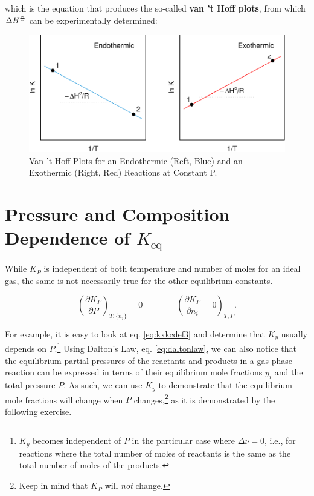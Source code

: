 \documentclass[
]{book}
\theoremstyle{definition}
\theoremstyle{definition}
\theoremstyle{definition}
\theoremstyle{remark}
\begin{document}
which is the equation that produces the so-called \textbf{van 't Hoff plots}, from which \(\Delta H^{-\kern-6pt{\ominus}\kern-6pt-}\) can be experimentally determined:

\begin{figure}

{\centering \includegraphics{pchem1_files/figure-latex/vthoffplt-1} 

}

\caption{Van 't Hoff Plots for an Endothermic (Reft, Blue) and an Exothermic (Right, Red) Reactions at Constant P.}\label{fig:vthoffplt}
\end{figure}

\hypertarget{pressure-and-composition-dependence-of-k_texteq}{%
\section{\texorpdfstring{Pressure and Composition Dependence of \(K_{\text{eq}}\)}{Pressure and Composition Dependence of K\_\{\textbackslash text\{eq\}\}}}\label{pressure-and-composition-dependence-of-k_texteq}}

While \(K_P\) is independent of both temperature and number of moles for an ideal gas, the same is not necessarily true for the other equilibrium constants.

\begin{equation}
\left( \frac{\partial K_P}{\partial P} \right)_{T,\{n_i\}} = 0 \qquad \qquad \left( \frac{\partial K_P}{\partial n_i}=0 \right)_{T,P}.
\label{eq:kppni}
\end{equation}

For example, it is easy to look at eq. \eqref{eq:kxkcdef3} and determine that \(K_y\) usually depends on \(P\).\footnote{\(K_y\) becomes independent of \(P\) in the particular case where \(\Delta \nu=0\), i.e., for reactions where the total number of moles of reactants is the same as the total number of moles of the products.} Using Dalton's Law, eq. \eqref{eq:daltonlaw}, we can also notice that the equilibrium partial pressures of the reactants and products in a gas-phase reaction can be expressed in terms of their equilibrium mole fractions \(y_i\) and the total pressure \(P\). As such, we can use \(K_y\) to demonstrate that the equilibrium mole fractions will change when \(P\) changes,\footnote{Keep in mind that \(K_P\) will \emph{not} change.} as it is demonstrated by the following exercise.
\end{document}
